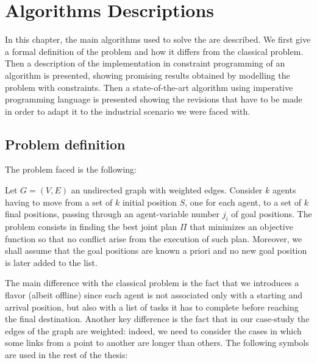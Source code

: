 \chapter{Algorithms Descriptions}
\label{ch:solutions}
In this chapter, the main algorithms used to solve the  are
described. We first give a formal definition of the problem and how it
differs from the classical  problem. Then a description of the
implementation in constraint programming of an algorithm is presented, showing
promising results obtained by modelling the problem with constraints. \newline
Then a state-of-the-art algorithm using imperative programming language is
presented showing the revisions that have to be made in order to adapt it to
the industrial scenario we were faced with.
%
%
%
\section{Problem definition}
The problem faced is the following:
\begin{definition}
  Let $G=(V,E)$ an undirected graph with weighted edges. Consider $k$ agents
  having to move from a set of $k$ initial position $S$, one for each agent, to
  a set of $k$ final positions, passing through an agent-variable number $j_i$
  of goal positions. The problem consists in finding the best joint plan $\Pi$
  that minimizes an objective function so that no conflict arise from the
  execution of such plan. \newline
  Moreover, we shall assume that the goal positions are known a priori and no
  new goal position is later added to the list.
\end{definition}
The main difference with the classical  problem is the fact that
we introduces a  flavor (albeit offline) since each agent is not
associated only with a starting and arrival position, but also with a list of
tasks it has to complete before reaching the final destination. \newline
Another key difference is the fact that in our case-study the edges of the 
graph are weighted: indeed, we need to consider the cases in which some links 
from a point to another are longer than others. \newline
The following symbols are used in the rest of the thesis:
